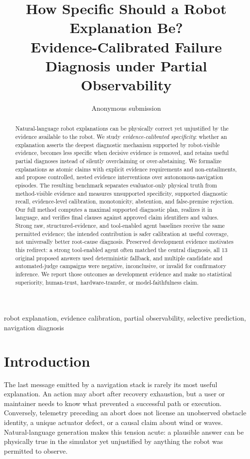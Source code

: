 \documentclass[conference]{IEEEtran}
\title{How Specific Should a Robot Explanation Be?\\
Evidence-Calibrated Failure Diagnosis under Partial Observability}
\author{Anonymous submission}
\begin{document}
\maketitle

\begin{abstract}
Natural-language robot explanations can be physically correct yet unjustified by the evidence
available to the robot. We study \emph{evidence-calibrated specificity}: whether an explanation
asserts the deepest diagnostic mechanism supported by robot-visible evidence, becomes less
specific when decisive evidence is removed, and retains useful partial diagnoses instead of
silently overclaiming or over-abstaining. We formalize explanations as atomic claims with explicit
evidence requirements and non-entailments, and propose controlled, nested evidence interventions
over autonomous-navigation episodes. The resulting benchmark separates evaluator-only physical
truth from method-visible evidence and measures unsupported specificity, supported diagnostic
recall, evidence-level calibration, monotonicity, abstention, and false-premise rejection. Our
full method computes a maximal supported diagnostic plan, realizes it in language, and verifies
final clauses against approved claim identifiers and values. Strong raw, structured-evidence, and
tool-enabled agent baselines receive the same permitted evidence; the intended contribution is
safer calibration at useful coverage, not universally better root-cause diagnosis. Preserved
development evidence motivates this redirect: a strong tool-enabled agent often matched the
central diagnosis, all 13 original proposed answers used deterministic fallback, and multiple
candidate and automated-judge campaigns were negative, inconclusive, or invalid for confirmatory
inference. We report those outcomes as development evidence and make no statistical superiority,
human-trust, hardware-transfer, or model-faithfulness claim.
\end{abstract}

\begin{IEEEkeywords}
robot explanation, evidence calibration, partial observability, selective prediction, navigation diagnosis
\end{IEEEkeywords}

\section{Introduction}

The last message emitted by a navigation stack is rarely its most useful explanation. An action
may abort after recovery exhaustion, but a user or maintainer needs to know what prevented a
successful path or execution. Conversely, telemetry preceding an abort does not license an
unobserved obstacle identity, a unique actuator defect, or a causal claim about wind or waves.
Natural-language generation makes this tension acute: a plausible answer can be physically true
in the simulator yet unjustified by anything the robot was permitted to observe.
\end{document}
